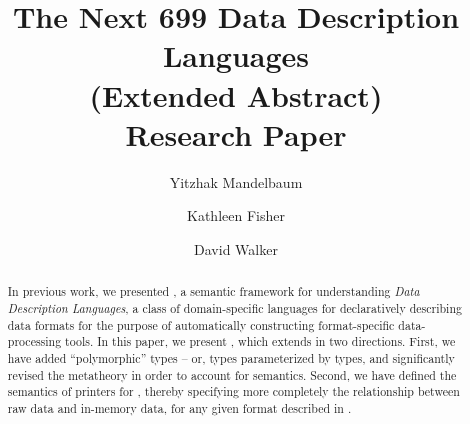 \documentclass[tfpsymp,ams,pagenumbers]{tfp05symp}
\begin{document}
\title{The Next 699 Data Description Languages\\(Extended
  Abstract)\\Research Paper}
\author{Yitzhak Mandelbaum \and Kathleen Fisher \and David Walker}



\maketitle{}

\begin{abstract}  


  In previous work, we presented \ddcold{}, a semantic framework for
  understanding {\em Data Description Languages}, a class of
  domain-specific languages for declaratively describing data formats
  for the purpose of automatically constructing format-specific
  data-processing tools. In this paper, we present \ddc{}, which
  extends \ddcold{} in two directions. First, we have added
  ``polymorphic'' types -- or, types parameterized by types, and
  significantly revised the metatheory in order to account for
  semantics. Second, we have defined the semantics of printers
  for \ddc{}, thereby specifying more completely the relationship
  between raw data and in-memory data, for any given format described
  in \ddc{}.
\end{abstract}











% 
% 

%

%
\end{document}
